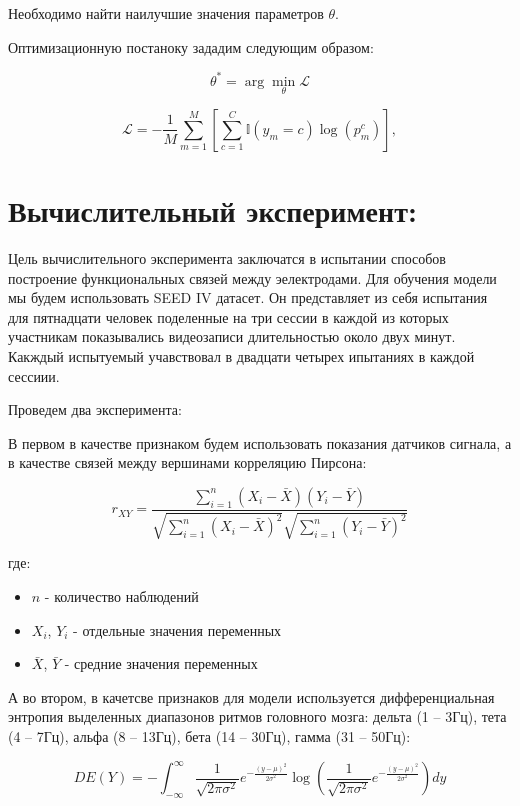 \documentclass[12pt, twoside]{article}
\begin{document}
Необходимо найти наилучшие значения параметров $\theta$.

Оптимизационную постаноку зададим следующим образом:

$$
\theta^* = \arg\min_{\theta} \mathcal{L}
$$

$$
\mathcal{L} = -\frac{1}{M} \sum_{m=1}^M \left[ \sum_{c=1}^C \mathbb{I}(y_m = c) \log(p_m^c) \right],
$$

\section{Вычислительный эксперимент:}
Цель вычислительного эксперимента заключатся в испытании способов построение функциональных связей между эелектродами. Для обучения модели мы будем использовать SEED IV датасет. Он представляет из себя испытания для пятнадцати человек поделенные на три сессии в каждой из которых участникам показывались видеозаписи длительностью около двух минут. Какждый испытуемый учавствовал в двадцати четырех ипытаниях в каждой сессиии.

Проведем два эксперимента:

В первом в качестве признаком будем использовать показания датчиков сигнала, а в качестве связей между вершинами корреляцию Пирсона:

\begin{equation}
r_{XY} = \frac{\sum\limits_{i=1}^n (X_i - \bar{X})(Y_i - \bar{Y})}{\sqrt{\sum\limits_{i=1}^n (X_i - \bar{X})^2} \sqrt{\sum\limits_{i=1}^n (Y_i - \bar{Y})^2}}
\end{equation}

где:
\begin{itemize}
    \item $n$ - количество наблюдений
    \item $X_i$, $Y_i$ - отдельные значения переменных
    \item $\bar{X}$, $\bar{Y}$ - средние значения переменных
\end{itemize}

А во втором, в качетсве признаков для модели используется дифференциальная энтропия выделенных диапазонов ритмов головного мозга: дельта (1 – 3Гц), тета (4 – 7Гц), альфа (8 – 13Гц), бета (14 – 30Гц), гамма (31 – 50Гц):

\begin{equation}
DE(Y) = - \int_{-\infty}^{\infty} \frac{1}{\sqrt{2\pi\sigma^2}} e^{-\frac{(y-\mu)^2}{2\sigma^2}} \log \left( \frac{1}{\sqrt{2\pi\sigma^2}} e^{-\frac{(y-\mu)^2}{2\sigma^2}} \right) dy
\end{equation}
\end{document}
